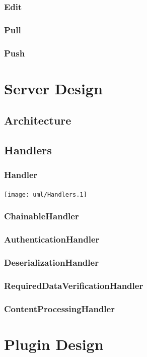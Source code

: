 \documentclass{report}
\begin{document}
			\subsubsection{Edit}
			
			\subsubsection{Pull}	
			
			\subsubsection{Push}	

	\section{Server Design}
		\subsection{Architecture}
			

		\subsection{Handlers}
			\subsubsection{Handler}
				\texttt{[image: uml/Handlers.1]}
			\subsubsection{ChainableHandler}
			\subsubsection{AuthenticationHandler}
			\subsubsection{DeserializationHandler}
			\subsubsection{RequiredDataVerificationHandler}
			\subsubsection{ContentProcessingHandler}

	\section{Plugin Design}
\end{document}
